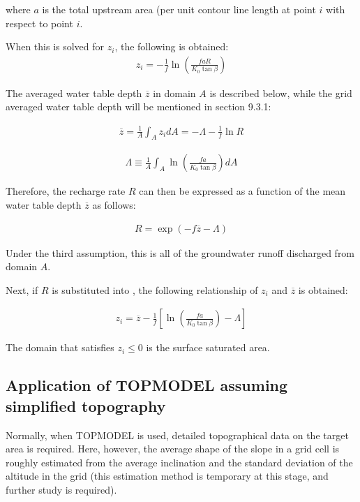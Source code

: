 where \(a\) is the total upstream area (per unit contour line length at point \(i\) with respect to point \(i\).

When this is solved for \(z_i\), the following is obtained: \begin{eqnarray}
z_i = -\frac{1}{f} \ln \left( \frac{faR}{K_0 \tan \beta}\right)  \label{eq264}
\end{eqnarray}

The averaged water table depth \(\overline{z}\) in domain \(A\) is described below, while the grid averaged water table depth will be mentioned in section 9.3.1:

\begin{eqnarray}
\overline{z} = \frac1{A}\int_{A} z_i dA
  = - \Lambda - \frac1{f} \ln R  \label{eq265}
\end{eqnarray}

\begin{eqnarray}
\Lambda \equiv
  \frac1{A}\int_{A} \ln \left( \frac{fa}{K_0 \tan \beta}\right) dA  \label{eq266}
\end{eqnarray}

Therefore, the recharge rate \(R\) can then be expressed as a function of the mean water table depth \(\overline{z}\) as follows:

\begin{eqnarray}
R = \exp (-f \overline{z} -\Lambda)  \label{eq267}
\end{eqnarray}

Under the third assumption, this is all of the groundwater runoff discharged from domain \(A\).

Next, if \(R\) is substituted into \hyperref[eq264]{} , the following relationship of \(z_i\) and \(\overline{z}\) is obtained:

\begin{eqnarray}
 z_i = \overline{z} - \frac{1}{f} \left[
\ln \left( \frac{fa}{K_0 \tan \beta}\right) - \Lambda
\right]  \label{eq268}
\end{eqnarray}

The domain that satisfies \(z_i \leq 0\) is the surface saturated area.

\subsection{Application of TOPMODEL assuming simplified topography}\label{application-of-topmodel-assuming-simplified-topography}

Normally, when TOPMODEL is used, detailed topographical data on the target area is required. Here, however, the average shape of the slope in a grid cell is roughly estimated from the average
inclination and the standard deviation of the altitude in the grid (this estimation method is temporary at this stage, and further study is required).

